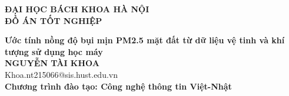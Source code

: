 \documentclass[DoAn.tex]{subfiles}
\begin{document}
\begin{titlepage}
\thispagestyle{empty}
\begin{center}

{\textbf{\large{ĐẠI HỌC BÁCH KHOA HÀ NỘI}}}\\[2.5cm]

{\textbf{\huge{ ĐỒ ÁN TỐT NGHIỆP}}}\\[0.8cm]
{\textbf{\Large{Ước tính nồng độ bụi mịn PM2.5 mặt đất từ dữ liệu vệ tinh và khí tượng sử dụng học máy }}\\[0.8cm]

{\textbf{\large{NGUYỄN TÀI KHOA}}}\\
{\large{Khoa.nt215066@sis.hust.edu.vn}}\\[0.5cm]

{\textbf{\large{Chương trình đào tạo: Công nghệ thông tin Việt-Nhật}}}%

\vspace{2.5cm}
\begin{table}[H]
\centering
{}
\end{table}}
\end{center}



\end{titlepage}
\end{document}
